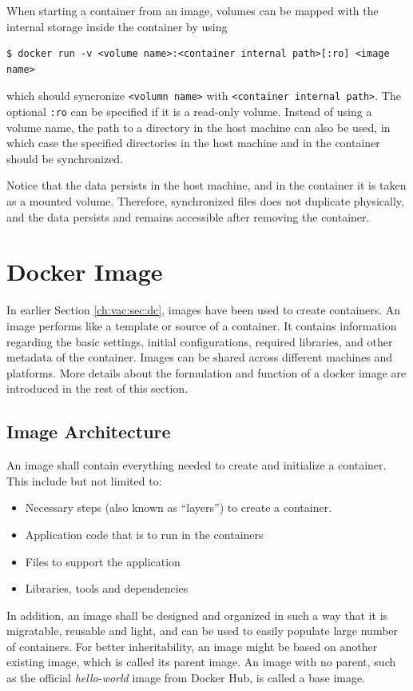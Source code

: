 When starting a container from an image, volumes can be mapped with the internal storage inside the container by using
\begin{lstlisting}
$ docker run -v <volume name>:<container internal path>[:ro] <image name>
\end{lstlisting}
which should syncronize \verb|<volumn name>| with \verb|<container internal path>|. The optional \verb|:ro| can be specified if it is a read-only volume. Instead of using a volume name, the path to a directory in the host machine can also be used, in which case the specified directories in the host machine and in the container should be synchronized.

Notice that the data persists in the host machine, and in the container it is taken as a mounted volume. Therefore, synchronized files does not duplicate physically, and the data persists and remains accessible after removing the container.

\section{Docker Image} \label{ch:vac:sec:di}

In earlier Section \ref{ch:vac:sec:dc}, images have been used to create containers. An image performs like a template or source of a container. It contains information regarding the basic settings, initial configurations, required libraries, and other metadata of the container. Images can be shared across different machines and platforms. More details about the formulation and function of a docker image are introduced in the rest of this section.

\subsection{Image Architecture}

An image shall contain everything needed to create and initialize a container. This include but not limited to:
\begin{itemize}
  \item Necessary steps (also known as ``layers'') to create a container.
  \item Application code that is to run in the containers
  \item Files to support the application
  \item Libraries, tools and dependencies
\end{itemize}
In addition, an image shall be designed and organized in such a way that it is migratable, reusable and light, and can be used to easily populate large number of containers. For better inheritability, an image might be based on another existing image, which is called its parent image. An image with no parent, such as the official \textit{hello-world} image from Docker Hub, is called a base image.

